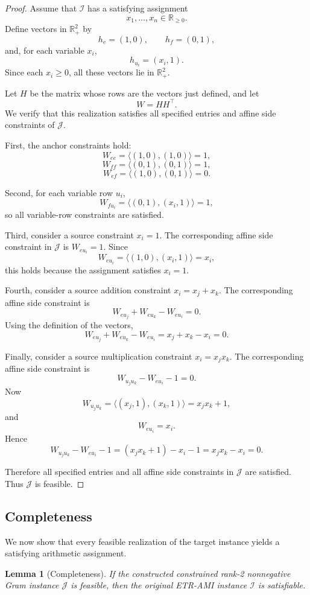 \documentclass[11pt]{article}
\newtheorem{lemma}[theorem]{Lemma}
\begin{document}
\begin{proof}
Assume that \(\mathcal{I}\) has a satisfying assignment
\[
x_1,\dots,x_n \in \mathbb{R}_{\ge 0}.
\]
Define vectors in \(\mathbb{R}_+^2\) by
\[
h_e=(1,0),\qquad h_f=(0,1),
\]
and, for each variable \(x_i\),
\[
h_{u_i}=(x_i,1).
\]
Since each \(x_i\ge 0\), all these vectors lie in \(\mathbb{R}_+^2\).

Let \(H\) be the matrix whose rows are the vectors just defined, and let
\[
W = HH^\top.
\]
We verify that this realization satisfies all specified entries and affine side
constraints of \(\mathcal{J}\).

First, the anchor constraints hold:
\[
W_{ee}=\langle (1,0),(1,0)\rangle = 1,
\]
\[
W_{ff}=\langle (0,1),(0,1)\rangle = 1,
\]
\[
W_{ef}=\langle (1,0),(0,1)\rangle = 0.
\]

Second, for each variable row \(u_i\),
\[
W_{f u_i}
=
\langle (0,1),(x_i,1)\rangle
=
1,
\]
so all variable-row constraints are satisfied.

Third, consider a source constraint \(x_i=1\). The corresponding affine side
constraint in \(\mathcal{J}\) is \(W_{e u_i}=1\). Since
\[
W_{e u_i}
=
\langle (1,0),(x_i,1)\rangle
=
x_i,
\]
this holds because the assignment satisfies \(x_i=1\).

Fourth, consider a source addition constraint \(x_i=x_j+x_k\). The
corresponding affine side constraint is
\[
W_{e u_j}+W_{e u_k}-W_{e u_i}=0.
\]
Using the definition of the vectors,
\[
W_{e u_j}+W_{e u_k}-W_{e u_i}
=
x_j+x_k-x_i
=
0.
\]

Finally, consider a source multiplication constraint \(x_i=x_jx_k\). The
corresponding affine side constraint is
\[
W_{u_j u_k}-W_{e u_i}-1=0.
\]
Now
\[
W_{u_j u_k}
=
\langle (x_j,1),(x_k,1)\rangle
=
x_jx_k+1,
\]
and
\[
W_{e u_i}=x_i.
\]
Hence
\[
W_{u_j u_k}-W_{e u_i}-1
=
(x_jx_k+1)-x_i-1
=
x_jx_k-x_i
=
0.
\]

Therefore all specified entries and all affine side constraints in
\(\mathcal{J}\) are satisfied. Thus \(\mathcal{J}\) is feasible.
\end{proof}

\subsection{Completeness}
\label{subsec:completeness}

We now show that every feasible realization of the target instance yields a
satisfying arithmetic assignment.

\begin{lemma}[Completeness]
\label{lem:completeness}
If the constructed constrained rank-2 nonnegative Gram instance
\(\mathcal{J}\) is feasible, then the original \textsc{ETR-AMI} instance
\(\mathcal{I}\) is satisfiable.
\end{lemma}
\end{document}
